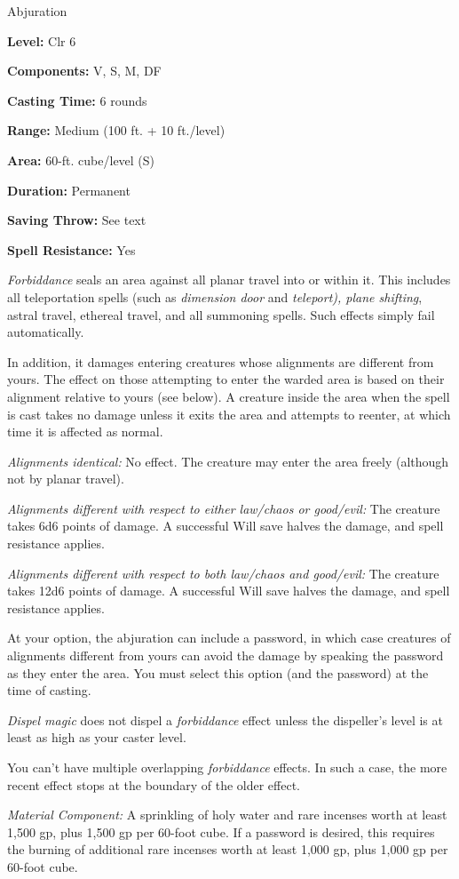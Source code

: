 
Abjuration

\textbf{Level:} Clr 6

\textbf{Components:} V, S, M, DF

\textbf{Casting Time:} 6 rounds

\textbf{Range:} Medium (100 ft. + 10 ft./level)

\textbf{Area:} 60-ft. cube/level (S)

\textbf{Duration:} Permanent

\textbf{Saving Throw:} See text

\textbf{Spell Resistance:} Yes

\textit{Forbiddance} seals an area against all planar travel into or within it. 
This includes all teleportation spells (such as \textit{dimension door} and \textit{teleport), 
plane shifting}, astral travel, ethereal travel, and all summoning spells. Such 
effects simply fail automatically.

In addition, it damages entering creatures whose alignments are different from 
yours. The effect on those attempting to enter the warded area is based on their 
alignment relative to yours (see below). A creature inside the area when the spell 
is cast takes no damage unless it exits the area and attempts to reenter, at which 
time it is affected as normal.

\textit{Alignments identical:} No effect. The creature may enter the area freely 
(although not by planar travel).

\textit{Alignments different with respect to either law/chaos or good/evil:} The 
creature takes 6d6 points of damage. A successful Will save halves the damage, 
and spell resistance applies.

\textit{Alignments different with respect to both law/chaos and good/evil:} The 
creature takes 12d6 points of damage. A successful Will save halves the damage, 
and spell resistance applies.

At your option, the abjuration can include a password, in which case creatures 
of alignments different from yours can avoid the damage by speaking the password 
as they enter the area. You must select this option (and the password) at the time 
of casting.

\textit{Dispel magic} does not dispel a \textit{forbiddance} effect unless the 
dispeller's level is at least as high as your caster level.

You can't have multiple overlapping \textit{forbiddance} effects. In such a case, 
the more recent effect stops at the boundary of the older effect.

\textit{Material Component:} A sprinkling of holy water and rare incenses worth 
at least 1,500 gp, plus 1,500 gp per 60-foot cube. If a password is desired, this 
requires the burning of additional rare incenses worth at least 1,000 gp, plus 
1,000 gp per 60-foot cube.

